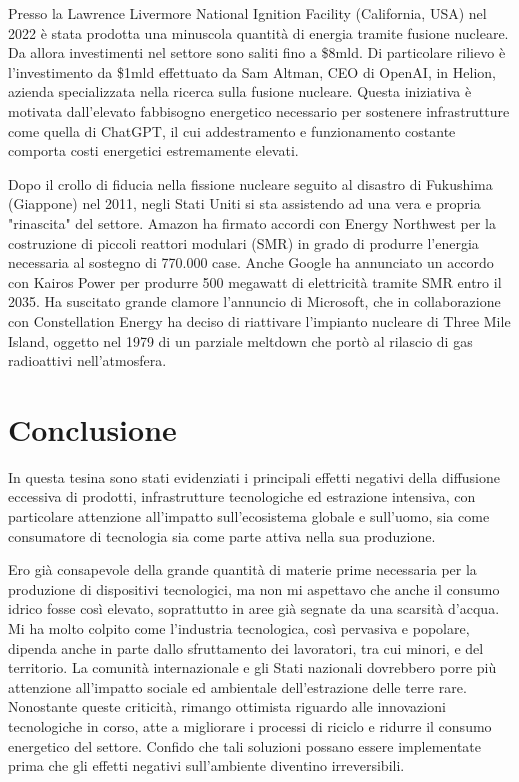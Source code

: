 \documentclass[12pt,a4paper,oneside]{book}
\begin{document}
Presso la Lawrence Livermore National Ignition Facility (California, USA) nel 2022 è stata prodotta una minuscola quantità di energia tramite fusione nucleare. Da allora investimenti nel settore sono saliti fino a \$8mld. Di particolare rilievo è l'investimento da \$1mld effettuato da Sam Altman, CEO di OpenAI, in Helion, azienda specializzata nella ricerca sulla fusione nucleare. Questa iniziativa è motivata dall'elevato fabbisogno energetico necessario per sostenere infrastrutture come quella di ChatGPT, il cui addestramento e funzionamento costante comporta costi energetici estremamente elevati.

Dopo il crollo di fiducia nella fissione nucleare seguito al disastro di Fukushima (Giappone) nel 2011, negli Stati Uniti si sta assistendo ad una vera e propria "rinascita" del settore. Amazon ha firmato accordi con Energy Northwest per la costruzione di piccoli reattori modulari (SMR) in grado di produrre l'energia necessaria al sostegno di 770.000 case. Anche Google ha annunciato un accordo con Kairos Power per produrre 500 megawatt di elettricità tramite SMR entro il 2035.
Ha suscitato grande clamore l'annuncio di Microsoft, che in collaborazione con Constellation Energy ha deciso di riattivare l'impianto nucleare di Three Mile Island, oggetto nel 1979 di un parziale meltdown che portò al rilascio di gas radioattivi nell'atmosfera.

\chapter{Conclusione}

In questa tesina sono stati evidenziati i principali effetti negativi della diffusione eccessiva di prodotti, infrastrutture tecnologiche ed estrazione intensiva, con particolare attenzione all'impatto sull'ecosistema globale e sull'uomo, sia come consumatore di tecnologia sia come parte attiva nella sua produzione.

Ero già consapevole della grande quantità di materie prime necessaria per la produzione di dispositivi tecnologici, ma non mi aspettavo che anche il consumo idrico fosse così elevato, soprattutto in aree già segnate da una scarsità d'acqua.
Mi ha molto colpito come l'industria tecnologica, così pervasiva e popolare, dipenda anche in parte dallo sfruttamento dei lavoratori, tra cui minori, e del territorio. La comunità internazionale e gli Stati nazionali dovrebbero porre più attenzione all'impatto sociale ed ambientale dell'estrazione delle terre rare.
Nonostante queste criticità, rimango ottimista riguardo alle innovazioni tecnologiche in corso, atte a migliorare i processi di riciclo e ridurre il consumo energetico del settore. Confido che tali soluzioni possano essere implementate prima che gli effetti negativi sull'ambiente diventino irreversibili.
\end{document}

